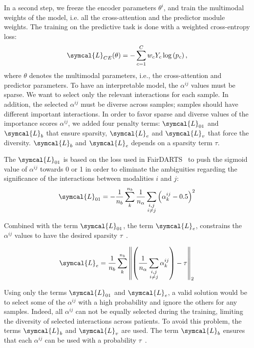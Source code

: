 \documentclass[../main.tex]{subfiles}
\begin{document}
		In a second step, we freeze the encoder parameters \(\theta^i\), and train the multimodal weights of the model, i.e. all the cross-attention and the predictor module weights.
		The training on the predictive task is done with a weighted cross-entropy loss:
		\begin{equation*}
			\symcal{L}_{CE}(\theta) = - \sum_{c=1}^{C}w_c Y_c \log\left( p_c\right) \text{,}
		\end{equation*}
		where \(\theta\) denotes the multimodal parameters, i.e., the cross-attention and predictor parameters.
		To have an interpretable model, the \(\alpha^{ij}\) values must be sparse.
		We want to select only the relevant interactions for each sample.
		In addition, the selected \(\alpha^{ij}\) must be diverse across samples; samples should have different important interactions.
		In order to favor sparse and diverse values of the importance scores \(\alpha^{ij}\), we added four penalty terms: \(\symcal{L}_{01}\) and \(\symcal{L}_{b}\) that ensure sparsity, \(\symcal{L}_{e}\) and \(\symcal{L}_{v}\) that force the diversity.
		\(\symcal{L}_{b}\) and \(\symcal{L}_{e}\) depends on a sparsity term \(\tau\).

		The \(\symcal{L}_{01}\) is based on the loss used in FairDARTS~\cite{FairDARTS} to push the sigmoid value of \(\alpha^{ij}\) towards 0 or 1 in order to eliminate the ambiguities regarding the significance of the interactions between modalities \(i\) and \(j\):
		\[ \symcal{L}_{01} = - \frac{1}{n_{b}}\sum_{k}^{n_b}\frac{1}{n_{\alpha}}\sum_{\substack{i,j \\ i \neq j}} \left( \alpha_k^{ij} - 0.5 \right)^2 \]

		Combined with the term \(\symcal{L}_{01}\), the term \(\symcal{L}_{e}\), constrains the \(\alpha^{ij}\) values to have the desired sparsity \(\tau\)~\cite{Bengio2015ConditionalCI}.

		\[ \symcal{L}_{e} = \frac{1}{n_b} \sum_{k}^{n_b} \left\| \left(\frac{1}{n_{\alpha}}\sum_{\substack{i,j \\ i \neq j}} \alpha^{ij}_{k}\right) - \tau \right\|_2\]

		Using only the terms \(\symcal{L}_{01}\) and \(\symcal{L}_{e}\), a valid solution would be to select some of the \(\alpha^{ij}\) with a high probability and ignore the others for any samples.
		Indeed, all \(\alpha^{ij}\) can not be equally selected during the training, limiting the diversity of selected interactions across patients.
		To avoid this problem, the terms \(\symcal{L}_{b}\) and \(\symcal{L}_{v}\) are used.
		The term \(\symcal{L}_{b}\) ensures that each \(\alpha^{ij}\) can be used with a probability \(\tau\)~\cite{Bengio2015ConditionalCI}.
\end{document}
